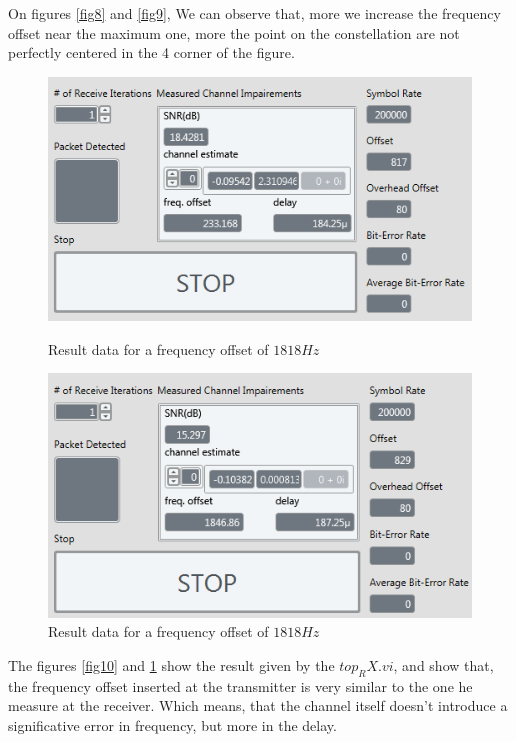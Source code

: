 \documentclass[frenchb, oneside, headings=normal]{scrartcl}
\begin{document}
On figures \ref{fig8} and \ref{fig9}, We can observe that, more we increase the frequency offset near the maximum one, more the point on the constellation are not perfectly centered in the 4 corner of the figure.

\begin{figure}[!ht]
    \begin{minipage}[b]{0.48\linewidth}
        \centering \includegraphics[scale=0.7]{img/USRP_value_227.PNG}
     \caption{Result data for a frequency offset of $1818 Hz$}
     \label{fig10}
    \end{minipage}\hfill
    \begin{minipage}[b]{0.48\linewidth}
         \centering \includegraphics[scale=0.7]{img/USRP_value_1818.PNG}
          \caption{Result data for a frequency offset of $1818 Hz$}
          \label{fig11}
    \end{minipage}  
\end{figure}

The figures \ref{fig10} and \ref{fig11} show the result given by the $top_RX.vi$, and show that, the frequency offset inserted at the transmitter is very similar to the one he measure at the receiver. Which means, that the channel itself doesn't introduce a significative error in frequency, but more in the delay.
\end{document}
